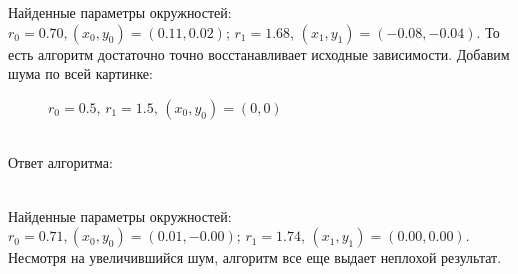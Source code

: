 Найденные параметры окружностей: $r_0 = 0.70, (x_0, y_0) = (0.11, 0.02); \, r_1 = 1.68, \, (x_1, y_1) = (-0.08, -0.04)$. То есть алгоритм достаточно точно восстанавливает исходные зависимости.
\newpage
Добавим шума по всей картинке: \\
\begin{figure}[h]
\caption{$r_0 = 0.5, \, r_1 = 1.5, \, (x_0, y_0) = (0, 0)$}
\end{figure} \\
Ответ алгоритма: \\
\begin{figure}[h]
\end{figure}\\
Найденные параметры окружностей: $r_0 = 0.71, (x_0, y_0) = (0.01, -0.00); \, r_1 = 1.74, \, (x_1, y_1) = (0.00, 0.00)$.  Несмотря на увеличившийся шум, алгоритм все еще выдает неплохой результат. \newpage
